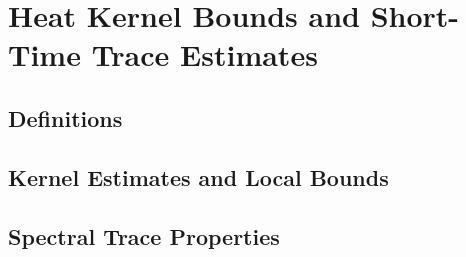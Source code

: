\section{Heat Kernel Bounds and Short-Time Trace Estimates}
\label{sec:heat-kernel-asymptotics}



\subsection{Definitions}


\subsection{Kernel Estimates and Local Bounds}













\subsection{Spectral Trace Properties}





